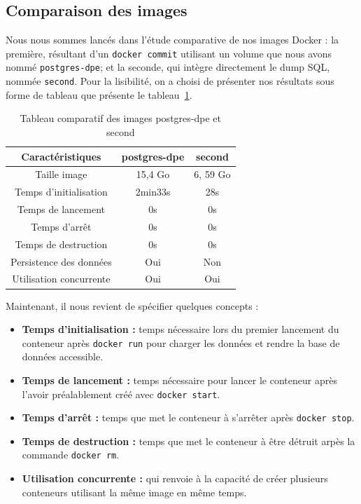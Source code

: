     \subsection{Comparaison des images}
    Nous nous sommes lanc\'es dans l'\'etude comparative de nos images Docker : la premi\`ere, r\'esultant d'un \lstinline{docker commit} utilisant un volume que nous avons nomm\'e \lstinline{postgres-dpe}; et la seconde, qui int\`egre directement le dump SQL, nomm\'ee \lstinline{second}. Pour la lisibilit\'e, on a choisi de pr\'esenter nos r\'esultats sous forme de tableau que pr\'esente le tableau~\ref{tab:tab1}.


    \begin{table}[H]
        \centering
        \begin{tabular}{c|c|c}
    \textbf{Caract\'eristiques} & \textbf{postgres-dpe} & \textbf{second} \\
    \hline
    Taille image & 15,4 Go & 6, 59 Go \\
    Temps d'initialisation & 2min33s & 28s \\
    Temps de lancement & 0s & 0s \\
    Temps d'arr\^et & 0s & 0s \\
    Temps de destruction & 0s  & 0s \\
    Persistence des donn\'ees & Oui & Non \\
    Utilisation concurrente & Oui & Oui \\
        \end{tabular}
        \caption{Tableau comparatif des images postgres-dpe et second}
        \label{tab:tab1}
    \end{table}
    
    Maintenant, il nous revient de sp\'ecifier quelques concepts :
    \begin{itemize}
        \item [\textbullet] \textbf{Temps d'initialisation :} temps n\'ecessaire lors du premier lancement du conteneur apr\`es \lstinline{docker run} pour charger les donn\'ees et rendre la base de donn\'ees accessible.
        \item [\textbullet] \textbf{Temps de lancement :} temps n\'ecessaire pour lancer le conteneur apr\`es l'avoir pr\'ealablement cr\'e\'e avec \lstinline{docker start}.
        \item [\textbullet] \textbf{Temps d'arr\^et :} temps que met le conteneur \`a s'arr\^eter apr\`es \lstinline{docker stop}.
        \item [\textbullet] \textbf{Temps de destruction :} temps que met le conteneur \`a \^etre d\'etruit arp\`es la commande \lstinline{docker rm}.
        \item [\textbullet] \textbf{Utilisation concurrente :} qui renvoie \`a la capacit\'e de cr\'eer plusieurs conteneurs utilisant la m\^eme image en  m\^eme temps.\\
    \end{itemize}
    
